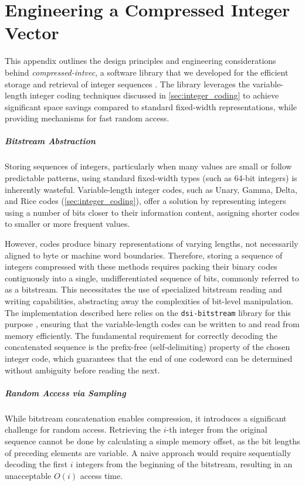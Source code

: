 \appendix
\chapter{Engineering a Compressed Integer Vector}
\label{app:compressed_intvec_engineering}

\noindent This appendix outlines the design principles and engineering considerations behind \emph{compressed-intvec}, a software library that we developed for the efficient storage and retrieval of integer sequences \cite{compressed-intvec}. The library leverages the variable-length integer coding techniques discussed in \autoref{sec:integer_coding} to achieve significant space savings compared to standard fixed-width representations, while providing mechanisms for fast random access.

\paragraph{Bitstream Abstraction}
Storing sequences of integers, particularly when many values are small or follow predictable patterns, using standard fixed-width types (such as 64-bit integers) is inherently wasteful. Variable-length integer codes, such as Unary, Gamma, Delta, and Rice codes (\autoref{sec:integer_coding}), offer a solution by representing integers using a number of bits closer to their information content, assigning shorter codes to smaller or more frequent values.

However, codes produce binary representations of varying lengths, not necessarily aligned to byte or machine word boundaries. Therefore, storing a sequence of integers compressed with these methods requires packing their binary codes contiguously into a single, undifferentiated sequence of bits, commonly referred to as a bitstream. This necessitates the use of specialized bitstream reading and writing capabilities, abstracting away the complexities of bit-level manipulation. The implementation described here relies on the \texttt{dsi-bitstream} library for this purpose \cite{dsi-bitstream}, ensuring that the variable-length codes can be written to and read from memory efficiently. The fundamental requirement for correctly decoding the concatenated sequence is the prefix-free (self-delimiting) property of the chosen integer code, which guarantees that the end of one codeword can be determined without ambiguity before reading the next.

\paragraph{Random Access via Sampling}
While bitstream concatenation enables compression, it introduces a significant challenge for random access. Retrieving the $i$-th integer from the original sequence cannot be done by calculating a simple memory offset, as the bit lengths of preceding elements are variable. A naive approach would require sequentially decoding the first $i$ integers from the beginning of the bitstream, resulting in an unacceptable $O(i)$ access time.

